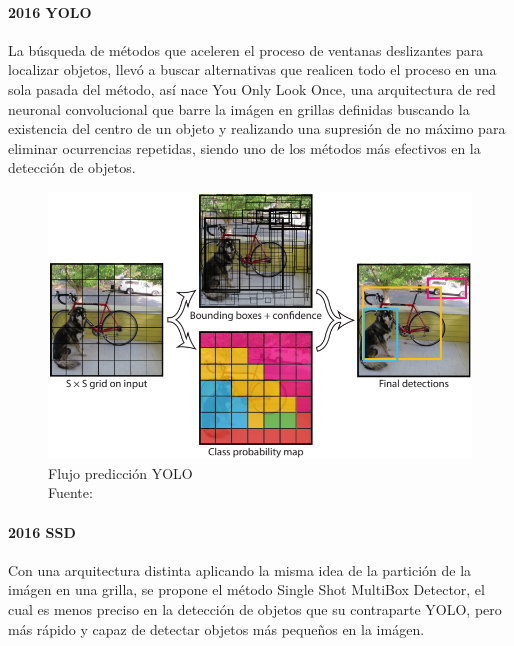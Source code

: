 \paragraph{2016 YOLO}
La búsqueda de métodos que aceleren el proceso de ventanas deslizantes para localizar objetos, llevó a buscar alternativas que realicen todo el proceso en una sola pasada del método, así nace You Only Look Once, una arquitectura de red neuronal convolucional que barre la imágen en grillas definidas buscando la existencia del centro de un objeto y realizando una supresión de no máximo para eliminar ocurrencias repetidas, siendo uno de los métodos más efectivos en la detección de objetos. \citep{Redmon2016YouOL}
\begin{figure}[H]
    \centering
	\includegraphics[scale=0.5]{imagenes/yolo}
    \caption[Flujo predicción YOLO]{Flujo predicción YOLO\\Fuente: \citep{Redmon2016YouOL}}
\end{figure}
\paragraph{2016 SSD}
Con una arquitectura distinta aplicando la misma idea de la partición de la imágen en una grilla, se propone el método Single Shot MultiBox Detector, el cual es menos preciso en la detección de objetos que su contraparte YOLO, pero más rápido y capaz de detectar objetos más pequeños en la imágen. \citep{liu-ssd}

